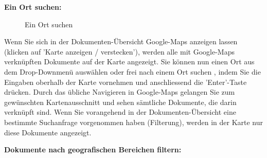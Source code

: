 \textbf{Ein Ort suchen:} 

\begin{figure}[H]
\caption{Ein Ort suchen}
\end{figure}

Wenn Sie sich in der Dokumenten-Übersicht Google-Maps anzeigen lassen (klicken auf 'Karte anzeigen / verstecken'), werden alle mit Google-Maps verknüpften Dokumente auf der Karte angezeigt. Sie können nun einen Ort aus dem Drop-Downmenü auswählen  oder frei nach einem Ort suchen , indem Sie die Eingaben oberhalb der Karte vornehmen  und anschliessend die 'Enter'-Taste drücken. Durch das übliche Navigieren in Google-Maps gelangen Sie zum gewünschten Kartenausschnitt und sehen sämtliche Dokumente, die darin verknüpft sind. Wenn Sie vorangehend in der Dokumenten-Übersicht eine bestimmte Suchanfrage vorgenommen haben (Filterung), werden in der Karte nur diese Dokumente angezeigt. \newline

\pagebreak
\textbf{Dokumente nach geografischen Bereichen filtern:} \\

